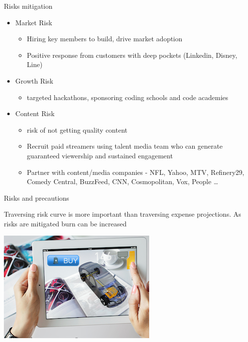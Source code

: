 \documentclass[12pt]{beamer}
\begin{document}
\begin{frame}[fragile]{Risks mitigation}
 \begin{itemize}[<+-| alert@+>]
\item[ ]Market Risk
\begin{itemize}[<+-| alert@+>]
\item Hiring key members to build, drive market adoption
\item Positive response from customers with deep pockets (Linkedin, Disney, Line) 
\end{itemize}

\item[ ]Growth Risk
\begin{itemize}[<+-| alert@+>]
\item targeted hackathons, sponsoring coding schools and code academies
\end{itemize}

\item[ ]Content Risk
\begin{itemize}[<+-| alert@+>]
\item risk of not getting quality content
\item Recruit paid streamers using talent media team who can generate guaranteed viewership and sustained engagement
\item Partner with content/media companies - NFL, Yahoo, MTV, Refinery29, Comedy Central, BuzzFeed, CNN, Cosmopolitan, Vox, People \ldots
\end{itemize}

\end{itemize}
\end{frame}
\begin{frame}[standout]
 Risks and precautions



 Traversing risk curve is more important than traversing expense projections. As risks are mitigated burn can be increased 

\includegraphics[scale=.2]{static/arad/arad5}
 
\end{frame}
\end{document}
